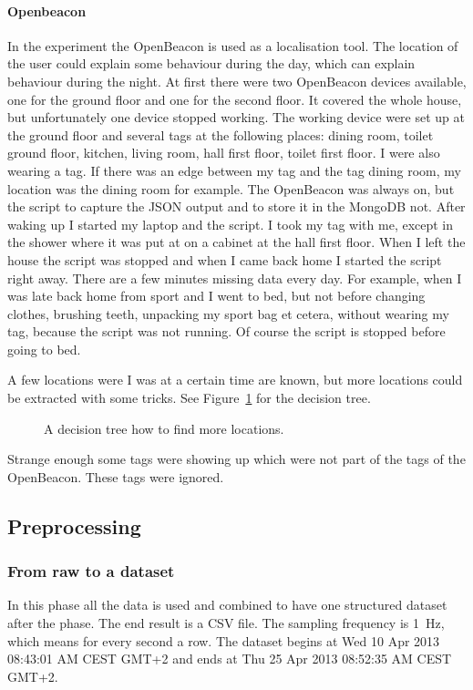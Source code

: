 		\paragraph{Openbeacon}
			In the experiment the OpenBeacon is used as a localisation tool. The location of the user could explain some behaviour during the day, which can explain behaviour during the night. At first there were two OpenBeacon devices available, one for the ground floor and one for the second floor. It covered the whole house, but unfortunately one device stopped working. The working device were set up at the ground floor and several tags at the following places: dining room, toilet ground floor, kitchen, living room, hall first floor, toilet first floor. I were also wearing a tag. If there was an edge between my tag and the tag dining room, my location was the dining room for example. The OpenBeacon was always on, but the script to capture the JSON output and to store it in the MongoDB not. After waking up I started my laptop and the script. I took my tag with me, except in the shower where it was put at on a cabinet at the hall first floor. When I left the house the script was stopped and when I came back home I started the script right away. There are a few minutes missing data every day. For example, when I was late back home from sport and I went to bed, but not before changing clothes, brushing teeth, unpacking my sport bag et cetera, without wearing my tag, because the script was not running. Of course the script is stopped before going to bed.
			
			A few locations were I was at a certain time are known, but more locations could be extracted with some tricks. See Figure~\ref{fig:decisiontree} for the decision tree.

				\begin{figure}[h!]
					
					\caption{A decision tree how to find more locations.}
					\label{fig:decisiontree}
				\end{figure}

				Strange enough some tags were showing up which were not part of the tags of the OpenBeacon. These tags were ignored.
		
		\clearpage
				
	\subsection{Preprocessing}
		\label{sec:preprocessing}
		\subsubsection{From raw to a dataset}
			\label{sec:rawdataset}
			In this phase all the data is used and combined to have one structured dataset after the phase. The end result is a CSV file. The sampling frequency is \SI{1}{\hertz}, which means for every second a row. The dataset begins at Wed 10 Apr 2013 08:43:01 AM CEST GMT+2 and ends at Thu 25 Apr 2013 08:52:35 AM CEST GMT+2. 
			
